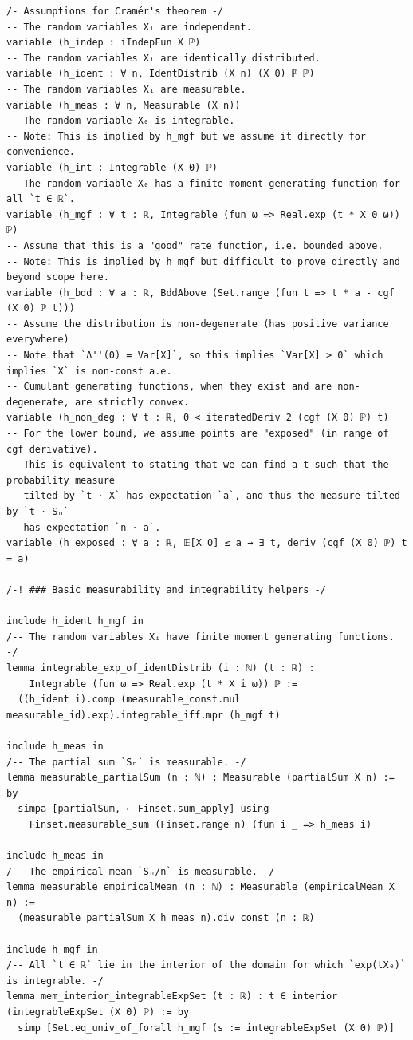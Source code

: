 \newpage
\begin{lstlisting}
/- Assumptions for Cramér's theorem -/
-- The random variables Xᵢ are independent.
variable (h_indep : iIndepFun X ℙ)
-- The random variables Xᵢ are identically distributed.
variable (h_ident : ∀ n, IdentDistrib (X n) (X 0) ℙ ℙ)
-- The random variables Xᵢ are measurable.
variable (h_meas : ∀ n, Measurable (X n))
-- The random variable X₀ is integrable.
-- Note: This is implied by h_mgf but we assume it directly for convenience.
variable (h_int : Integrable (X 0) ℙ)
-- The random variable X₀ has a finite moment generating function for all `t ∈ ℝ`.
variable (h_mgf : ∀ t : ℝ, Integrable (fun ω => Real.exp (t * X 0 ω)) ℙ)
-- Assume that this is a "good" rate function, i.e. bounded above.
-- Note: This is implied by h_mgf but difficult to prove directly and beyond scope here.
variable (h_bdd : ∀ a : ℝ, BddAbove (Set.range (fun t => t * a - cgf (X 0) ℙ t)))
-- Assume the distribution is non-degenerate (has positive variance everywhere)
-- Note that `Λ''(0) = Var[X]`, so this implies `Var[X] > 0` which implies `X` is non-const a.e.
-- Cumulant generating functions, when they exist and are non-degenerate, are strictly convex.
variable (h_non_deg : ∀ t : ℝ, 0 < iteratedDeriv 2 (cgf (X 0) ℙ) t)
-- For the lower bound, we assume points are "exposed" (in range of cgf derivative).
-- This is equivalent to stating that we can find a t such that the probability measure
-- tilted by `t · X` has expectation `a`, and thus the measure tilted by `t · Sₙ`
-- has expectation `n · a`.
variable (h_exposed : ∀ a : ℝ, 𝔼[X 0] ≤ a → ∃ t, deriv (cgf (X 0) ℙ) t = a)

/-! ### Basic measurability and integrability helpers -/

include h_ident h_mgf in
/-- The random variables Xᵢ have finite moment generating functions. -/
lemma integrable_exp_of_identDistrib (i : ℕ) (t : ℝ) :
    Integrable (fun ω => Real.exp (t * X i ω)) ℙ :=
  ((h_ident i).comp (measurable_const.mul measurable_id).exp).integrable_iff.mpr (h_mgf t)

include h_meas in
/-- The partial sum `Sₙ` is measurable. -/
lemma measurable_partialSum (n : ℕ) : Measurable (partialSum X n) := by
  simpa [partialSum, ← Finset.sum_apply] using
    Finset.measurable_sum (Finset.range n) (fun i _ => h_meas i)

include h_meas in
/-- The empirical mean `Sₙ/n` is measurable. -/
lemma measurable_empiricalMean (n : ℕ) : Measurable (empiricalMean X n) :=
  (measurable_partialSum X h_meas n).div_const (n : ℝ)

include h_mgf in
/-- All `t ∈ ℝ` lie in the interior of the domain for which `exp(tX₀)` is integrable. -/
lemma mem_interior_integrableExpSet (t : ℝ) : t ∈ interior (integrableExpSet (X 0) ℙ) := by
  simp [Set.eq_univ_of_forall h_mgf (s := integrableExpSet (X 0) ℙ)]
\end{lstlisting}
